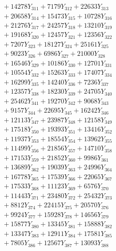 \documentclass[a4paper,10pt]{article}
\begin{document}
{\begin{align}
&\;  + 14278 Y_{311} + 7179 Y_{312} + 22633 Y_{313} \\[0.3ex]
&\;  + 20658 Y_{314} + 15473 Y_{315} + 10728 Y_{316} \\[0.3ex]
&\;  + 21276 Y_{317} + 24257 Y_{318} + 13210 Y_{319} \\[0.3ex]
&\;  + 19168 Y_{320} + 12457 Y_{321} + 12356 Y_{322} \\[0.3ex]
&\;  + 7207 Y_{323} + 18127 Y_{324} + 25161 Y_{325} \\[0.3ex]
&\;  + 9023 Y_{326} + 6986 Y_{327} + 21000 Y_{328} \\[0.5ex]\allowbreak
&\;  + 16546 Y_{329} + 10186 Y_{330} + 12701 Y_{331} \\[0.3ex]
&\;  + 10554 Y_{332} + 15263 Y_{333} + 17407 Y_{334} \\[0.3ex]
&\;  + 16299 Y_{335} + 14240 Y_{336} + 7236 Y_{337} \\[0.3ex]
&\;  + 12357 Y_{338} + 18230 Y_{339} + 24705 Y_{340} \\[0.3ex]
&\;  + 25462 Y_{341} + 19270 Y_{342} + 9068 Y_{343} \\[0.3ex]
&\;  + 9157 Y_{344} + 22695 Y_{345} + 16242 Y_{346} \\[0.3ex]
&\;  + 12113 Y_{347} + 23987 Y_{348} + 12158 Y_{349} \\[0.3ex]
&\;  + 17518 Y_{350} + 19393 Y_{351} + 13416 Y_{352} \\[0.3ex]
&\;  + 11937 Y_{353} + 18554 Y_{354} + 13962 Y_{355} \\[0.3ex]
&\;  + 11499 Y_{356} + 21856 Y_{357} + 14710 Y_{358} \\[0.5ex]\allowbreak
&\;  + 17153 Y_{359} + 21852 Y_{360} + 9986 Y_{361} \\[0.3ex]
&\;  + 13689 Y_{362} + 19039 Y_{363} + 24996 Y_{364} \\[0.3ex]
&\;  + 16778 Y_{365} + 17539 Y_{366} + 22065 Y_{367} \\[0.3ex]
&\;  + 17533 Y_{368} + 11123 Y_{369} + 6576 Y_{370} \\[0.3ex]
&\;  + 11443 Y_{371} + 23480 Y_{372} + 25432 Y_{373} \\[0.3ex]
&\;  + 8812 Y_{374} + 22415 Y_{375} + 20570 Y_{376} \\[0.3ex]
&\;  + 9924 Y_{377} + 15928 Y_{378} + 14656 Y_{379} \\[0.3ex]
&\;  + 15877 Y_{380} + 13345 Y_{381} + 15888 Y_{382} \\[0.3ex]
&\;  + 13347 Y_{383} + 12911 Y_{384} + 17581 Y_{385} \\[0.3ex]
&\;  + 7805 Y_{386} + 12567 Y_{387} + 13093 Y_{388} \\[0.5ex]\allowbreak

\end{align}}
\end{document}

